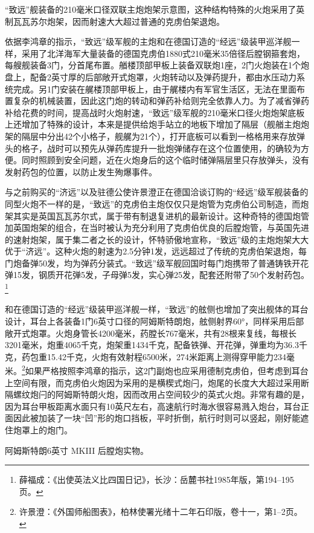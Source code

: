 \documentclass[12pt,UTF8]{ctexbook}
\begin{document}
“致远”舰装备的210毫米口径双联主炮炮架示意图，这种结构特殊的火炮采用了英制瓦瓦苏尔炮架，因而射速大大超过普通的克虏伯架退炮。

依据李鸿章的指示，“致远”级军舰的主炮和在德国订造的“经远”级装甲巡洋舰一样，采用了北洋海军大量装备的德国克虏伯1880式210毫米35倍径后膛钢箍套炮，每艘舰装备3门，分首尾布置。艏楼顶部甲板上装备双联炮1座，2门火炮装在1个炮盘上，配备2英寸厚的后部敞开式炮罩，火炮转动以及弹药提升，都由水压动力系统完成。另1门安装在艉楼顶部甲板上，由于艉楼内有军官生活区，无法在里面布置复杂的机械装置，因此这门炮的转动和弹药补给则完全依靠人力。为了减省弹药补给花费的时间，提高战时火炮射速，“致远”级军舰的210毫米口径火炮炮架底板上还增加了特殊的设计，本来是提供给炮手站立的地板下增加了隔层（舰艏主炮炮架的隔层中分出42个小格子，舰艉为21个），打开底板可以看到一格格用来存放弹头的格子，战时可以预先从弹药库提升一批炮弹储存在这个位置使用，的确较为方便。同时照顾到安全问题，近在火炮身后的这个临时储弹隔层里只存放弹头，没有发射药包的位置，以防止发生殉爆事件。

与之前购买的“济远”以及驻德公使许景澄正在德国洽谈订购的“经远”级军舰装备的同型火炮不一样的是，“致远”的克虏伯主炮仅仅只是炮管为克虏伯公司制造，而炮架其实是英国瓦瓦苏尔式，属于带有制退复进机的最新设计。这种奇特的德国炮管加英国炮架的组合，在当时被认为充分利用了克虏伯优良的后膛炮管，与英国先进的速射炮架，属于集二者之长的设计，怀特骄傲地宣称，“致远”级的主炮炮架大大优于“济远”。这种火炮的射速为2.5分钟1发，远远超过了传统的克虏伯架退炮，每门炮备弹50发，均为弹药分装式。“致远”级军舰回国时每门炮携带了普通铸铁开花弹15发，钢质开花弹5发，子母弹5发，实心弹25发，配套还附带了50个发射药包。\footnote{薛福成：《出使英法义比四国日记》，长沙：岳麓书社1985年版，第194--195页。}

和在德国订造的“经远”级装甲巡洋舰一样，“致远”的舷侧也增加了突出舰体的耳台设计，耳台上各装备1门6英寸口径的阿姆斯特朗炮，舷侧射界60°，同样采用后部敞开式炮罩。火炮身管长4200毫米，药膛长767毫米，共有28根来复线，每根长3201毫米，炮重4065千克，炮架重1434千克，配备铁弹、开花弹，弹重均为36.3千克，药包重15.42千克，火炮有效射程6500米，274米距离上测得穿甲能力234毫米。\footnote{许景澄：《外国师船图表》，柏林使署光绪十二年石印版，卷十一，第1--2页。}如果严格按照李鸿章的指示，这2门副炮也应采用德制克虏伯，但考虑到耳台上空间有限，而克虏伯火炮因为采用的是横楔式炮闩，炮尾的长度大大超过采用断隔螺纹炮闩的阿姆斯特朗火炮，因而改用占空间较少的英式火炮。非常有趣的是，因为耳台甲板距离水面只有10英尺左右，高速航行时海水很容易溅入炮台，耳台正面因此被加装了一块“凹”形的炮口挡板，平时折倒，航行时则可以竖起，刚好能遮住炮罩上的炮门。

阿姆斯特朗6英寸 MKIII 后膛炮实物。
\end{document}
